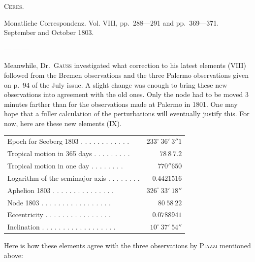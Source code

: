 \centerline{\textsc{Ceres.}}

\medskip
Monatliche Correspondenz. Vol. VIII, pp.\ 288—291 and pp.\ 369—371. September and October 1803.

\medskip
— — —

\medskip
Meanwhile, Dr.\ \textsc{Gauss} investigated what correction to his latest elements (VIII) followed from the Bremen observations and the three Palermo observations given on p.\ 94 of the July issue. A slight change was enough to bring these new observations into agreement with the old ones. Only the node had to be moved 3 minutes farther than for the observations made at Palermo in 1801. One may hope that a fuller calculation of the perturbations will eventually justify this. For now, here are these new elements (IX).

\begin{center}
\begingroup\fontsize{9}{11}\selectfont\setlength{\tabcolsep}{3pt}
\begin{tabular}{lr}
Epoch for Seeberg 1803 . . . . . . . . . . . . & $233^\circ\ 36'\ 3''1$ \\
Tropical motion in 365 days . . . . . . . . . & $78\ 8\ 7.2$ \\
Tropical motion in one day . . . . . . . . & $770''650$ \\
Logarithm of the semimajor axis . . . . . . . . & $0.4421516$ \\
Aphelion 1803 . . . . . . . . . . . . . . . & $326^\circ\ 33'\ 18''$ \\
Node 1803 . . . . . . . . . . . . . . . . . & $80\ 58\ 22$ \\
Eccentricity . . . . . . . . . . . . . . . . & $0.0788941$ \\
Inclination . . . . . . . . . . . . . . . . . . & $10^\circ\ 37'\ 54''$ \\
\end{tabular}\endgroup
\end{center}
%

Here is how these elements agree with the three observations by \textsc{Piazzi} mentioned above:

